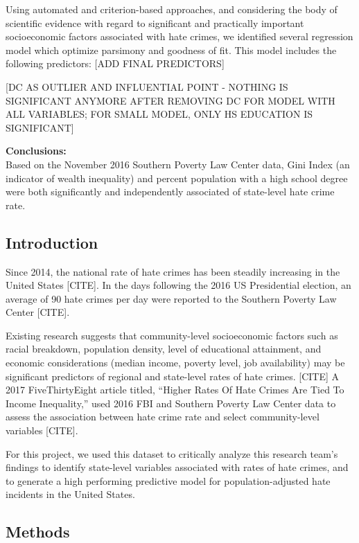 \documentclass[
]{article}
\begin{document}
Using automated and criterion-based approaches, and considering the body
of scientific evidence with regard to significant and practically
important socioeconomic factors associated with hate crimes, we
identified several regression model which optimize parsimony and
goodness of fit. This model includes the following predictors: {[}ADD
FINAL PREDICTORS{]}

{[}DC AS OUTLIER AND INFLUENTIAL POINT - NOTHING IS SIGNIFICANT ANYMORE
AFTER REMOVING DC FOR MODEL WITH ALL VARIABLES; FOR SMALL MODEL, ONLY HS
EDUCATION IS SIGNIFICANT{]}

\textbf{Conclusions:}\\
Based on the November 2016 Southern Poverty Law Center data, Gini Index
(an indicator of wealth inequality) and percent population with a high
school degree were both significantly and independently associated of
state-level hate crime rate.

\hypertarget{introduction}{%
\subsection{Introduction}\label{introduction}}

Since 2014, the national rate of hate crimes has been steadily
increasing in the United States {[}CITE{]}. In the days following the
2016 US Presidential election, an average of 90 hate crimes per day were
reported to the Southern Poverty Law Center {[}CITE{]}.

Existing research suggests that community-level socioeconomic factors
such as racial breakdown, population density, level of educational
attainment, and economic considerations (median income, poverty level,
job availability) may be significant predictors of regional and
state-level rates of hate crimes. {[}CITE{]} A 2017 FiveThirtyEight
article titled, ``Higher Rates Of Hate Crimes Are Tied To Income
Inequality,'' used 2016 FBI and Southern Poverty Law Center data to
assess the association between hate crime rate and select
community-level variables {[}CITE{]}.

For this project, we used this dataset to critically analyze this
research team's findings to identify state-level variables associated
with rates of hate crimes, and to generate a high performing predictive
model for population-adjusted hate incidents in the United States.

\hypertarget{methods}{%
\subsection{Methods}\label{methods}}
\end{document}
